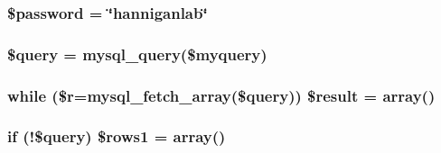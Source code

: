 \subsubsection[{\texorpdfstring{\$password}{$password}}]{\setlength{\rightskip}{0pt plus 5cm}\$password = \char`\"{}hanniganlab\char`\"{}}\hypertarget{_f_i_g__210___j_s_o_n_8php_a607686ef9f99ea7c42f4f3dd3dbb2b0d}{}\label{_f_i_g__210___j_s_o_n_8php_a607686ef9f99ea7c42f4f3dd3dbb2b0d}
\subsubsection[{\texorpdfstring{\$query}{$query}}]{\setlength{\rightskip}{0pt plus 5cm}\$query = mysql\+\_\+query(\$myquery)}\hypertarget{_f_i_g__210___j_s_o_n_8php_af59a5f7cd609e592c41dc3643efd3c98}{}\label{_f_i_g__210___j_s_o_n_8php_af59a5f7cd609e592c41dc3643efd3c98}
\subsubsection[{\texorpdfstring{\$result}{$result}}]{\setlength{\rightskip}{0pt plus 5cm}while (\$r=mysql\+\_\+fetch\+\_\+array(\$query)) \$result = array()}\hypertarget{_f_i_g__210___j_s_o_n_8php_a9148136d1e11f768be4f805d7e567da2}{}\label{_f_i_g__210___j_s_o_n_8php_a9148136d1e11f768be4f805d7e567da2}
\subsubsection[{\texorpdfstring{\$rows1}{$rows1}}]{\setlength{\rightskip}{0pt plus 5cm}if (!\$query) \$rows1 = array()}\hypertarget{_f_i_g__210___j_s_o_n_8php_a15da33e0f4006a60bff01708cb5d1428}{}\label{_f_i_g__210___j_s_o_n_8php_a15da33e0f4006a60bff01708cb5d1428}
